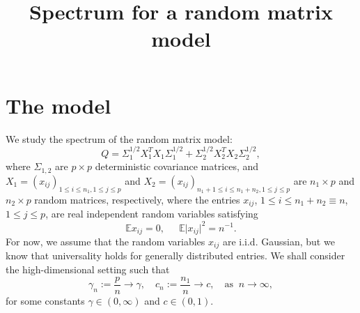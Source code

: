 \documentclass{article}
\title{Spectrum for a random matrix model}
\author{ }
\numberwithin{equation}{section}
\newcommand{\1}{\mathds{1}}
\numberwithin{equation}{section}
\renewcommand{\leq}{\leqslant}
\renewcommand{\le}{\leq}
\DeclareMathOperator{\var}{Var}
\DeclareMathOperator{\bv}{\mathbf{v}}
\DeclareMathOperator{\bu}{\mathbf{u}}
\theoremstyle{plain} %
\theoremstyle{remark}
\begin{document}




\section{The model}\label{sec_defspike}


We study the spectrum of the random matrix model: 
$$Q= \Sigma_1^{1/2}  X_1^T X_1 \Sigma_1^{1/2}  + \Sigma_2^{1/2}  X_2^T X_2 \Sigma_2^{1/2} ,$$
where $\Sigma_{1,2}$ are $p\times p$ deterministic covariance matrices, and $X_1=(x_{ij})_{1\le i \le n_1, 1\le j \le p}$ and $X_2=(x_{ij})_{n_1+1\le i \le n_1+n_2, 1\le j \le p}$ are $n_1\times p$ and $n_2 \times p$ random matrices, respectively, where the entries $x_{ij}$, $1 \leq i \leq n_1+n_2\equiv n$, $1 \leq j \leq p$, are real independent random variables satisfying
\begin{equation}\label{eq_12moment} %
\mathbb{E} x_{ij} =0, \ \quad \ \mathbb{E} \vert x_{ij} \vert^2  = n^{-1}.
\end{equation} 
For now, we assume that the random variables $x_{ij}$ are i.i.d. Gaussian, but we know that universality holds for generally distributed entries. %
We shall consider the high-dimensional setting such that
$$\gamma_n:= \frac{p} {n} \to \gamma,\quad c_n:= \frac{n_1}{n} \to c, \quad \text{as } \ n\to \infty, $$ 
for some constants $\gamma\in (0,\infty)$ and $c \in (0,1)$. 
\end{document}
